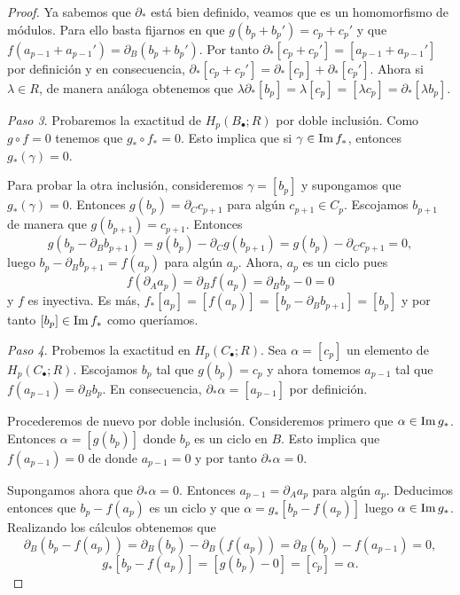 \begin{proof}
	Ya sabemos que $\partial_{*}$ está bien definido, veamos que es un homomorfismo
	de módulos. Para ello basta fijarnos en que $g(b_{p}+ b_{p}') = c_{p}+ c_{p}'$
	y que $f(a_{p-1}+ a_{p-1}') = \partial_{B}(b_{p}+ b_{p}')$. Por tanto $\partial
	_{*}[ c_{p}+ c_{p}'] = [a_{p-1}+ a_{p-1}']$ por definición y en consecuencia,
	$\partial_{*}[c_{p}+ c_{p}'] = \partial_{*}[c_{p}] + \partial_{*}[c_{p}']$. Ahora
	si $\lambda \in R$, de manera análoga obtenemos que
	$\lambda \partial_{*}[b_{p}] = \lambda [c_{p}] = [ \lambda c_{p}] = \partial_{*}
	[ \lambda b_{p}]$.
	
	\textit{Paso 3}. Probaremos la exactitud de $H_{p}(B_{\bullet};R)$ por doble
	inclusión. Como $g \circ f = 0$ tenemos que $g_{*}\circ f_{*}= 0$. Esto
	implica que si $\gamma \in \operatorname{Im} f_{*}$, entonces $g_{*}(\gamma) = 0$.
	
	Para probar la otra inclusión, consideremos $\gamma = [b_{p}]$ y supongamos
	que $g_{*}(\gamma) = 0$. Entonces $g(b_{p}) = \partial_{C}c_{p+1}$ para algún $c
	_{p+1}\in C_{p}$. Escojamos $b_{p+1}$ de manera que $g(b_{p+1}) = c_{p+1}$. Entonces
	\[
	g(b_{p}- \partial_{B}b_{p+1}) = g(b_{p}) - \partial_{C}g(b_{p+1}) = g(b_{p})
	- \partial_{C}c_{p+1}= 0,
	\]
	luego $b_{p}- \partial_{B}b_{p+1}= f(a_{p})$ para algún $a_{p}$. Ahora, $a_{p}$
	es un ciclo pues
	\[
	f(\partial_{A}a_{p}) = \partial_{B}f(a_{p}) = \partial_{B}b_{p}- 0 = 0
	\]
	y $f$ es inyectiva. Es más, $f_{*}[a_{p}] = [f(a_{p})] = [b_{p}- \partial_{B}b_{p+1}
	] = [b_{p}]$ y por tanto $[b_{p}] \in \operatorname{Im} f_{*}$ como queríamos.
	
	\textit{Paso 4}. Probemos la exactitud en $H_{p}(C_{\bullet};R)$. Sea
	$\alpha = [c_{p}]$ un elemento de $H_{p}(C_{\bullet};R)$. Escojamos $b_{p}$ tal
	que $g(b_{p}) = c_{p}$ y ahora tomemos $a_{p-1}$ tal que $f(a_{p-1}) = \partial
	_{B}b_{p}$. En consecuencia, $\partial_{*}\alpha = [a_{p-1}]$ por definición.
	
	Procederemos de nuevo por doble inclusión. Consideremos primero que
	$\alpha \in \operatorname{Im} g_{*}$. Entonces $\alpha = [g(b_{p})]$ donde $b_{p}$ es un ciclo
	en $B$. Esto implica que $f(a_{p-1}) = 0$ de donde $a_{p-1}= 0$ y por tanto
	$\partial_{*}\alpha = 0$.
	
	Supongamos ahora que $\partial_{*}\alpha = 0$. Entonces $a_{p-1}= \partial_{A}a
	_{p}$ para algún $a_{p}$. Deducimos entonces que $b_{p}- f(a_{p})$ es un ciclo
	y que $\alpha = g_{*}[b_{p}- f(a_{p})]$ luego $\alpha \in \operatorname{Im} g_{*}$. Realizando
	los cálculos obtenemos que
	\[
	\partial_{B}(b_{p}- f(a_{p})) = \partial_{B}(b_{p}) - \partial_{B}(f(a_{p}))
	= \partial_{B}(b_{p}) - f(a_{p-1}) = 0,
	\]
	\[
	g_{*}[b_{p}- f(a_{p})] = [g(b_{p}) - 0] = [c_{p}] = \alpha.
	\]
	

\end{proof}
